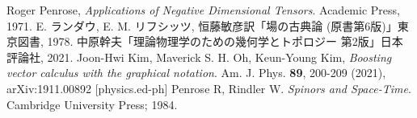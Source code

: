 \documentclass[dvipdfmx]{jsarticle}
\begin{document}
\tableofcontents

\pagebreak



\pagebreak



\pagebreak



\pagebreak



\pagebreak

\appendix



\begin{thebibliography}{2}
     Roger Penrose, \textit{Applications of Negative Dimensional Tensors}. Academic Press, 1971.
     E. ランダウ, E. M. リフシッツ, 恒藤敏彦訳「場の古典論 (原書第6版)」東京図書, 1978.
     中原幹夫「理論物理学のための幾何学とトポロジー 第2版」日本評論社, 2021.
     Joon-Hwi Kim, Maverick S. H. Oh, Keun-Young Kim, \textit{Boosting vector calculus with the graphical notation}. Am. J. Phys. \textbf{89}, 200-209 (2021), arXiv:1911.00892 [physics.ed-ph]
     Penrose R, Rindler W. \textit{Spinors and Space-Time}. Cambridge University Press; 1984.
\end{thebibliography}
\end{document}
